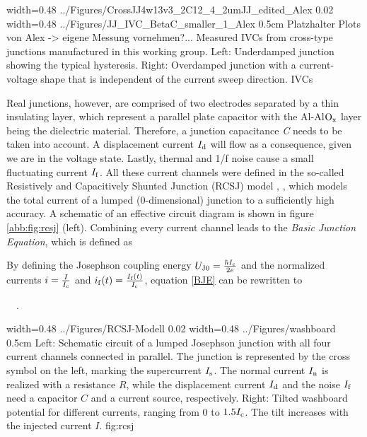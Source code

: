{width=0.48\textwidth}
{../Figures/CrossJJ4w13v3_2C12_4_2umJJ_edited_Alex}
{0.02\textwidth} %
{width=0.48\textwidth}
{../Figures/JJ_IVC_BetaC_smaller_1_Alex}
{0.5cm} %
{Platzhalter Plots von Alex -> eigene Messung vornehmen?... Measured IVCs from cross-type junctions manufactured in this working group. Left: Underdamped junction showing the typical hysteresis. Right: Overdamped junction with a current-voltage shape that is independent of the current sweep direction. }
{IVCs}

Real junctions, however, are comprised of two electrodes separated by a thin insulating layer, which represent a parallel plate capacitor with the Al-Al$\rm O_x$ layer being the dielectric material. Therefore, a junction capacitance \textit{C} needs to be taken into account. A displacement current $I_{\rm d}$ will flow as a consequence, given we are in the voltage state. Lastly, thermal and 1/f noise cause a small fluctuating current $I_{\rm f}$. All these current channels were defined in the so-called Resistively and Capacitively Shunted Junction (RCSJ) model \cite{Cumber1968}, \cite{Stewart1968}, which models the total current of a lumped (0-dimensional) junction to a sufficiently high accuracy. A schematic of an effective circuit diagram is shown in figure \ref{abb:fig:rcsj} (left). Combining every current channel leads to the \textit{Basic Junction Equation}, which is defined as \cite{Gross2016}


By defining the Josephson coupling energy $U_{\rm J0}=\frac{\hbar I_{\rm c}}{2e}$ and the normalized currents $i=\frac{I}{I_{\rm c}}$ and $i_{\rm f}(t)=\frac{I_{\rm f}(t)}{I_{\rm c}}$, equation \ref{BJE} can be rewritten to 

 \ \ . 

{width=0.48\textwidth}
{../Figures/RCSJ-Modell}
{0.02\textwidth} %
{width=0.48\textwidth}
{../Figures/washboard}
{0.5cm} %
{Left: Schematic circuit of a lumped Josephson junction with all four current channels connected in parallel. The junction is represented by the cross symbol on the left, marking the supercurrent $I_{\rm s}$. The normal current $I_{\rm n}$ is realized with a resistance $R$, while the displacement current $I_{\rm d}$ and the noise $I_{\rm f}$ need a capacitor $C$ and a current source, respectively. Right: Tilted washboard potential for different currents, ranging from 0 to $1.5I_{\rm c}$. The tilt increases with the injected current $I$.}
{fig:rcsj}

